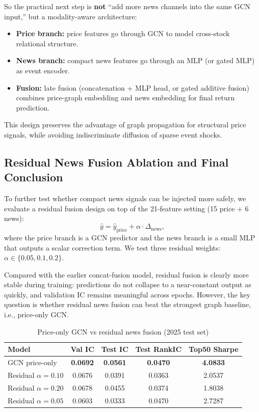 So the practical next step is \textbf{not} ``add more news channels into the same GCN input,'' but a modality-aware architecture:
\begin{itemize}
\item \textbf{Price branch:} price features go through GCN to model cross-stock relational structure.
\item \textbf{News branch:} compact news features go through an MLP (or gated MLP) as event encoder.
\item \textbf{Fusion:} late fusion (concatenation + MLP head, or gated additive fusion) combines price-graph embedding and news embedding for final return prediction.
\end{itemize}

This design preserves the advantage of graph propagation for structural price signals, while avoiding indiscriminate diffusion of sparse event shocks.

\subsection{Residual News Fusion Ablation and Final Conclusion}

To further test whether compact news signals can be injected more safely, we evaluate a residual fusion design on top of the 21-feature setting (15 price + 6 news):
\[
\hat{y} = \hat{y}_{\text{price}} + \alpha \cdot \Delta_{\text{news}},
\]
where the price branch is a GCN predictor and the news branch is a small MLP that outputs a scalar correction term. We test three residual weights: $\alpha \in \{0.05, 0.1, 0.2\}$.

Compared with the earlier concat-fusion model, residual fusion is clearly more stable during training: predictions do not collapse to a near-constant output as quickly, and validation IC remains meaningful across epochs. However, the key question is whether residual news fusion can beat the strongest graph baseline, i.e., price-only GCN.

\begin{table}[htbp]
\centering
\caption{Price-only GCN vs residual news fusion (2025 test set)}
\label{tab:gcn-residual-news-vs-price}
\begin{tabular}{lcccc}
\hline
Model & Val IC & Test IC & Test RankIC & Top50 Sharpe \\
\hline
GCN price-only & \textbf{0.0692} & \textbf{0.0561} & \textbf{0.0470} & \textbf{4.0833} \\
Residual $\alpha=0.10$ & 0.0676 & 0.0391 & 0.0363 & 2.0537 \\
Residual $\alpha=0.20$ & 0.0678 & 0.0455 & 0.0374 & 1.8038 \\
Residual $\alpha=0.05$ & 0.0603 & 0.0333 & 0.0470 & 2.7287 \\
\hline
\end{tabular}
\end{table}

